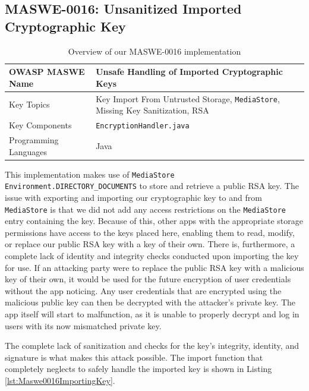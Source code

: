 \subsection{MASWE-0016: Unsanitized Imported Cryptographic Key}
\label{subsec:maswe-0016}

\begin{table}[H]
    \centering
    \renewcommand{\arraystretch}{1.3}
        \begin{tabular}{p{5cm} p{8cm}} 
        \toprule
        OWASP MASWE Name & Unsafe Handling of Imported Cryptographic Keys \\ 
        \midrule
        Key Topics & Key Import From Untrusted Storage, \texttt{MediaStore}, Missing Key Sanitization, RSA \\
        Key Components & \texttt{EncryptionHandler.java} \\
        Programming Languages & Java \\ 
        \bottomrule
        \end{tabular}
    \caption{Overview of our MASWE-0016 implementation}
    \label{tab:maswe-0016}
\end{table}

This implementation makes use of \texttt{MediaStore} \texttt{Environment.DIRECTORY\_DOCUMENTS} to store and retrieve a public RSA key. The issue with exporting and importing our cryptographic key to and from \texttt{MediaStore} is that we did not add any access restrictions on the \texttt{MediaStore} entry containing the key. Because of this, other apps with the appropriate storage permissions have access to the keys placed here, enabling them to read, modify, or replace our public RSA key with a key of their own. There is, furthermore, a complete lack of identity and integrity checks conducted upon importing the key for use. If an attacking party were to replace the public RSA key with a malicious key of their own, it would be used for the future encryption of user credentials without the app noticing. Any user credentials that are encrypted using the malicious public key can then be decrypted with the attacker's private key. The app itself will start to malfunction, as it is unable to properly decrypt and log in users with its now mismatched private key.

The complete lack of sanitization and checks for the key's integrity, identity, and signature is what makes this attack possible. The import function that completely neglects to safely handle the imported key is shown in Listing \ref{lst:Maswe0016ImportingKey}.

